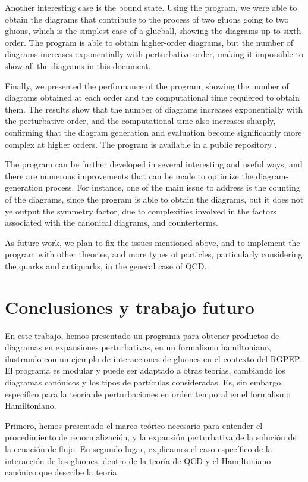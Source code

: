 \documentclass[11pt,a4paper,twoside,pdf]{article}
\numberwithin{equation}{section}
\begin{document}
Another interesting case is the bound state.
Using the program, we were able to obtain the diagrams that contribute to the process
of two gluons going to two gluons, which is the simplest case of a glueball, showing the diagrams
up to sixth order.
The program is able to obtain higher-order diagrams, but the number of
diagrams increases exponentially with perturbative order, making it impossible
to show all the diagrams in this document.

Finally, we presented the performance of the program, showing the number of diagrams
obtained at each order and the computational time requiered to obtain them. The results
show that the number of diagrams increases exponentially with the perturbative order,
and the computational time also increases sharply, confirming that the diagram generation
and evaluation become significantly more complex at higher orders.
The program is available in a public repository \cite{Liu_Computational_tools_for_2025}.

The program can be further developed in several interesting and useful ways, and there are numerous improvements that can
be made to optimize the diagram-generation process. For instance, one of the main issue to
address is the counting of the diagrams, since the program is able to obtain the diagrams,
but it does not ye output the symmetry factor, due to complexities involved in the factors
associated with the canonical diagrams, and counterterms.

As future work, we plan to fix the issues mentioned above, and to implement
the program with other theories, and more types of particles, particularly
considering the quarks and antiquarks, in the general case of QCD. 

\section{Conclusiones y trabajo futuro} \label{sec:conclusions_es}

En este trabajo, hemos presentado un programa para obtener productos de diagramas en
expansiones perturbativas, en un formalismo hamiltoniano, ilustrando con un ejemplo de interacciones de gluones en
el contexto del RGPEP.
El programa es modular y puede ser adaptado a otras teor\'ias, cambiando los
diagramas can\'onicos y los tipos de part\'iculas consideradas. Es, sin embargo, espec\'ifico para la
teor\'ia de perturbaciones en orden temporal en el formalismo Hamiltoniano.

Primero, hemos presentado el marco teórico necesario para entender el
procedimiento de renormalizaci\'on, y la expansi\'on perturbativa de la solución de la ecuación de flujo.
En segundo lugar, explicamos el caso espec\'ifico de la interacción de los gluones, dentro de la
teor\'ia de QCD y el Hamiltoniano can\'onico que describe la teor\'ia.
\end{document}
